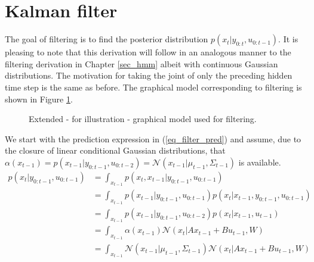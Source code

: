 \section{Kalman filter}
The goal of filtering is to find the posterior distribution $p(x_{t}|y_{0:t}, u_{0:t-1})$. It is pleasing to note that this derivation will follow in an analogous manner to the filtering derivation in Chapter \ref{sec_hmm} albeit with continuous Gaussian distributions. The motivation for taking the joint of only the preceding hidden time step is the same as before. The graphical model corresponding to filtering is shown in Figure \ref{fig_gm_linmods_filtering}.
\begin{figure}[H] 
\centering
{}
\caption{Extended - for illustration - graphical model used for filtering.}
\label{fig_gm_linmods_filtering}
\end{figure}
We start with the prediction expression in (\ref{eq_filter_pred}) and assume, due to the closure of linear conditional Gaussian distributions, that $\alpha(x_{t-1}) = p(x_{t-1}|y_{0:t-1}, u_{0:t-2}) = \mathcal{N}(x_{t-1}|\mu_{t-1}, \Sigma_{t-1}) $ is available. 
\begin{equation}
\begin{aligned}
p(x_t|y_{0:t-1}, u_{0:t-1}) &= \int_{x_{t-1}} p(x_t,x_{t-1}|y_{0:t-1}, u_{0:t-1}) \\
&= \int_{x_{t-1}} p(x_{t-1}|y_{0:t-1}, u_{0:t-1})p(x_{t}|x_{t-1}, y_{0:t-1}, u_{0:t-1}) \\
&= \int_{x_{t-1}} p(x_{t-1}|y_{0:t-1}, u_{0:t-2})p(x_{t}|x_{t-1}, u_{t-1}) \\
&= \int_{x_{t-1}} \alpha(x_{t-1})\mathcal{N}(x_{t}|Ax_{t-1}+Bu_{t-1}, W) \\
&= \int_{x_{t-1}} \mathcal{N}(x_{t-1}|\mu_{t-1}, \Sigma_{t-1}) \mathcal{N}(x_{t}|Ax_{t-1}+Bu_{t-1}, W) \\
\end{aligned}
\label{eq_filter_pred}
\end{equation} 
